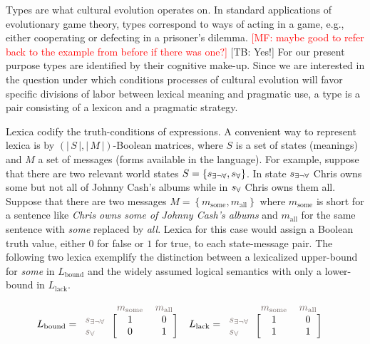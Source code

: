 \documentclass[a4paper, 11pt]{article}
\newcommand{\mf}[1]{\textcolor{Red}{[MF: #1]}}
\newcommand{\tb}[1]{\textcolor[rgb]{.8,.33,.0}{[TB: #1]}}%
\newcommand{\set}[1]{\left\{#1\right\}}
\newcommand{\card}[1]{\left \lvert \, #1 \, \right\rvert}
\newcommand{\States}{\ensuremath{S}\xspace}		%
\newcommand{\state}{\ensuremath{s}\xspace}		%
\newcommand{\mystate}[1]{\ensuremath{\state_{\text{#1}}}\xspace} %
\newcommand{\mylang}[1]{\ensuremath{L_{\text{#1}}}\xspace} %
\newcommand{\Messgs}{\ensuremath{M}\xspace}		%
\newcommand{\messg}{\ensuremath{m}\xspace}		%
\newcommand{\mymessg}[1]{\ensuremath{\messg_{\text{#1}}}\xspace} %
\newcommand{\ssome}{\mystate{\ensuremath{\exists\neg\forall}}}
\newcommand{\sall}{\mystate{\ensuremath{\forall}}}
\newcommand{\msome}{\mymessg{some}}
\newcommand{\mall}{\mymessg{all}}
\newcommand{\Lbound}{\mylang{bound}}
\newcommand{\Llack}{\mylang{lack}}
\newcommand{\mygray}[1]{{\textcolor{mygray}{#1}}}
\begin{document}
Types are what cultural evolution operates on. In standard applications of evolutionary game
theory, types correspond to ways of acting in a game, e.g., either cooperating or defecting in
a prisoner's dilemma. \mf{maybe good to refer back to the example from before if there was
  one?} \tb{Yes!} For our present purpose types are identified by their cognitive make-up. Since we are
interested in the question under which conditions processes of cultural evolution will favor
specific divisions of labor between lexical meaning and pragmatic use, a type is a pair
consisting of a lexicon and a pragmatic strategy.

Lexica codify the truth-conditions of expressions. A convenient way to represent lexica is by
$(\card{\States}, \card{\Messgs})$-Boolean matrices, where $\States$ is a set of states
(meanings) and $M$ a set of messages (forms available in the language). For example, suppose
that there are two relevant world states $\States = \set{\ssome, \sall}$. In state $\ssome$
Chris owns some but not all of Johnny Cash's albums while in $\sall$ Chris owns them
all. Suppose that there are two messages $\Messgs = \set{\msome, \mall}$ where $\msome$ is
short for a sentence like \emph{Chris owns some of Johnny Cash's albums} and $\mall$ for the
same sentence with \emph{some} replaced by \emph{all}.  
Lexica for this case would assign a Boolean truth value, either $0$ for false or $1$ for true, to each state-message pair. The following two lexica exemplify the distinction
between a lexicalized upper-bound for \emph{some} in $\Lbound$ and the widely assumed logical
semantics with only a lower-bound in $\Llack$.

\begin{align*}
  \Lbound & = \begin{blockarray}{lcc}
    & \mygray{\msome} & \mygray{\mall} \\
    \begin{block}{l[cc]}
      \mygray{\ssome} & 1 & 0 \\
      \mygray{\sall}  & 0 & 1 \\
    \end{block}
  \end{blockarray} &
  \Llack & = \begin{blockarray}{lcc}
    & \mygray{\msome} & \mygray{\mall} \\
    \begin{block}{l[cc]}
      \mygray{\ssome} & 1 & 0 \\
      \mygray{\sall}  & 1 & 1 \\
    \end{block}
  \end{blockarray}
\end{align*}
\end{document}
